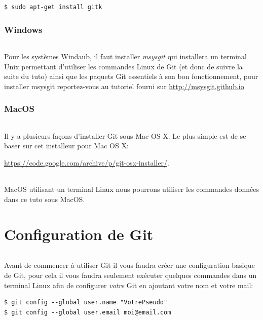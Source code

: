 \documentclass[french, a4paper, 12pt, titlepage]{article}
\begin{document}
\begin{lstlisting}
$ sudo apt-get install gitk
\end{lstlisting}

\section{Windows}
\paragraph{}Pour les systèmes Windaub, il faut installer \emph{msysgit} qui installera un terminal Unix permettant d'utiliser les commandes Linux de Git (et donc de suivre la suite du tuto) ainsi que les paquets Git essentiels à son bon fonctionnement, pour installer msysgit reportez-vous au tutoriel fourni sur \url{http://msysgit.github.io}

\section{MacOS}
\paragraph{}Il y a plusieurs façons d’installer Git sous Mac OS X. Le plus simple est de se baser sur cet installeur pour Mac OS X:

\url{https://code.google.com/archive/p/git-osx-installer/}.

\paragraph{} MacOS utilisant un terminal Linux nous pourrons utiliser les
commandes données dans ce tuto sous MacOS.

\newpage
\part{Configuration de Git}
\paragraph{}Avant de commencer à utiliser Git il vous faudra créer une configuration basique de Git, pour cela il vous faudra seulement exécuter quelques commandes dans un terminal Linux afin de configurer \emph{votre} Git en ajoutant votre nom et votre mail:
\begin{lstlisting}
$ git config --global user.name "VotrePseudo"
$ git config --global user.email moi@email.com
\end{lstlisting}
\end{document}
